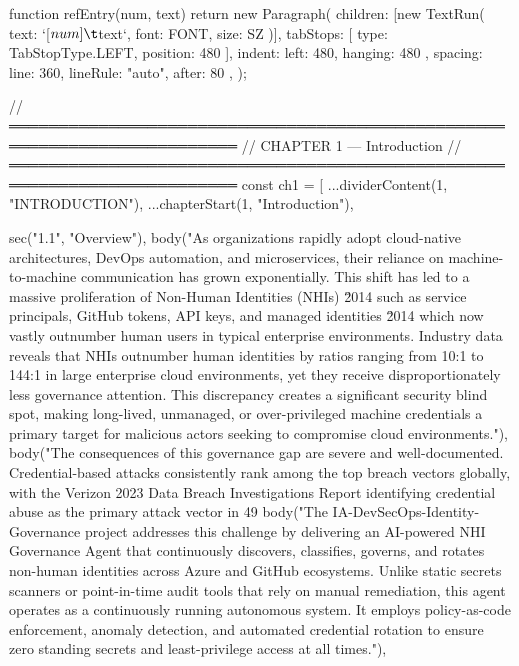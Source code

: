 function refEntry(num, text) {
  return new Paragraph({
    children: [new TextRun({ text: `[${num}]\t${text}`, font: FONT, size: SZ })],
    tabStops: [{ type: TabStopType.LEFT, position: 480 }],
    indent: { left: 480, hanging: 480 },
    spacing: { line: 360, lineRule: "auto", after: 80 },
  });
}

// ═════════════════════════════════════════════════════════════════════════
//  CHAPTER 1 — Introduction
// ═════════════════════════════════════════════════════════════════════════
const ch1 = [
  ...dividerContent(1, "INTRODUCTION"),
  ...chapterStart(1, "Introduction"),

  sec("1.1", "Overview"),
  body("As organizations rapidly adopt cloud-native architectures, DevOps automation, and microservices, their reliance on machine-to-machine communication has grown exponentially. This shift has led to a massive proliferation of Non-Human Identities (NHIs) \u2014 such as service principals, GitHub tokens, API keys, and managed identities \u2014 which now vastly outnumber human users in typical enterprise environments. Industry data reveals that NHIs outnumber human identities by ratios ranging from 10:1 to 144:1 in large enterprise cloud environments, yet they receive disproportionately less governance attention. This discrepancy creates a significant security blind spot, making long-lived, unmanaged, or over-privileged machine credentials a primary target for malicious actors seeking to compromise cloud environments."),
  body("The consequences of this governance gap are severe and well-documented. Credential-based attacks consistently rank among the top breach vectors globally, with the Verizon 2023 Data Breach Investigations Report identifying credential abuse as the primary attack vector in 49%
  body("The IA-DevSecOps-Identity-Governance project addresses this challenge by delivering an AI-powered NHI Governance Agent that continuously discovers, classifies, governs, and rotates non-human identities across Azure and GitHub ecosystems. Unlike static secrets scanners or point-in-time audit tools that rely on manual remediation, this agent operates as a continuously running autonomous system. It employs policy-as-code enforcement, anomaly detection, and automated credential rotation to ensure zero standing secrets and least-privilege access at all times."),

